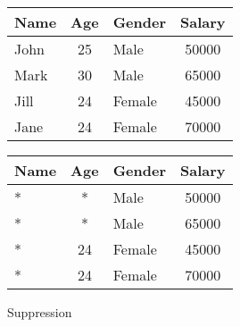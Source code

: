 \begin{figure}[H]
    \centering
    \begin{tabular}{l c l c}
        \toprule
        \textbf{Name} & \textbf{Age} & \textbf{Gender} & \textbf{Salary} \\
        \midrule
        John & 25 & Male   & 50000 \\
        Mark & 30 & Male   & 65000 \\
        Jill & 24 & Female & 45000 \\
        Jane & 24 & Female & 70000 \\
        \bottomrule
    \end{tabular}
    \quad
    \begin{tabular}{l c l c}
        \toprule
        \textbf{Name} & \textbf{Age} & \textbf{Gender} & \textbf{Salary} \\
        \midrule
        * & *  & Male   & 50000 \\
        * & *  & Male   & 65000 \\
        * & 24 & Female & 45000 \\
        * & 24 & Female & 70000 \\
        \bottomrule
    \end{tabular}
    \caption{Suppression}\label{fig:suppression_example}
\end{figure}